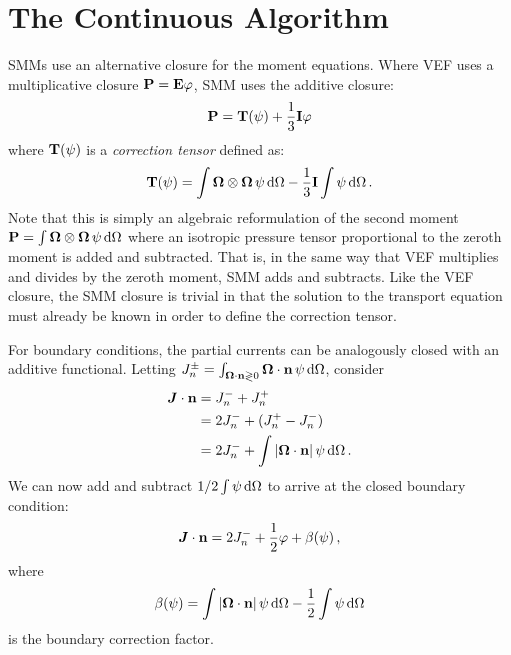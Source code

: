 \documentclass[../doc.tex]{subfiles}
\begin{document}
\section{The Continuous Algorithm}
SMMs use an alternative closure for the moment equations. Where VEF uses a multiplicative closure $\boldsymbol{\mathrm{P}} = \boldsymbol{\mathrm{E}}\varphi$, SMM uses the additive closure: 
	\begin{equation}
		\boldsymbol{\mathrm{P}} = \boldsymbol{\mathrm{T}}(\psi) + \frac{1}{3}\boldsymbol{\mathrm{I}} \varphi 
	\end{equation}
where $\boldsymbol{\mathrm{T}}(\psi)$ is a \emph{correction tensor} defined as: 
	\begin{equation} \label{smm:corrten}
		\boldsymbol{\mathrm{T}}(\psi) = \int \boldsymbol{\Omega}\otimes\boldsymbol{\Omega}\, \psi \mathop{}\!\mathrm{d} \Omega - \frac{1}{3}\boldsymbol{\mathrm{I}}\int \psi \mathop{}\!\mathrm{d} \Omega \,. 
	\end{equation}
Note that this is simply an algebraic reformulation of the second moment $\boldsymbol{\mathrm{P}} = \int \boldsymbol{\Omega}\otimes\boldsymbol{\Omega}\, \psi \mathop{}\!\mathrm{d} \Omega$ where an isotropic pressure tensor proportional to the zeroth moment is added and subtracted. That is, in the same way that VEF multiplies and divides by the zeroth moment, SMM adds and subtracts. 
Like the VEF closure, the SMM closure is trivial in that the solution to the transport equation must already be known in order to define the correction tensor. 

For boundary conditions, the partial currents can be analogously closed with an additive functional. Letting $J_n^\pm = \int_{\boldsymbol{\Omega}\cdot\boldsymbol{\mathrm{n}}\gtrless0} \boldsymbol{\Omega}\cdot\boldsymbol{\mathrm{n}}\, \psi \mathop{}\!\mathrm{d} \Omega$, consider 
	\begin{equation}
	\begin{aligned}
		\boldsymbol{J}\cdot\boldsymbol{\mathrm{n}} &= J_n^- + J_n^+ \\
		&= 2J_n^- + (J_n^+ - J_n^-) \\
		&= 2J_n^- + \int |\boldsymbol{\Omega}\cdot\boldsymbol{\mathrm{n}}|\,\psi \mathop{}\!\mathrm{d} \Omega \,. 
	\end{aligned}
	\end{equation}
We can now add and subtract $1/2 \int \psi \mathop{}\!\mathrm{d} \Omega$ to arrive at the closed boundary condition: 
	\begin{equation}
		\boldsymbol{J}\cdot\boldsymbol{\mathrm{n}} = 2J_n^- + \frac{1}{2}\varphi + \beta(\psi) \,, 
	\end{equation}
where 
	\begin{equation} \label{smm:corrfac}
		\beta(\psi) = \int |\boldsymbol{\Omega}\cdot\boldsymbol{\mathrm{n}}|\,\psi \mathop{}\!\mathrm{d} \Omega - \frac{1}{2}\int\psi \mathop{}\!\mathrm{d} \Omega 
	\end{equation}
is the boundary correction factor. 
\end{document}

